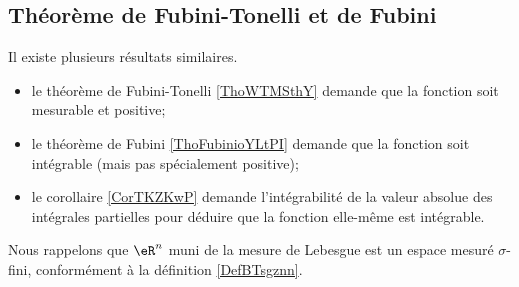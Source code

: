 \subsection{Théorème de Fubini-Tonelli et de Fubini}

Il existe plusieurs résultats similaires. 
\begin{itemize}
    \item
        le théorème de Fubini-Tonelli \ref{ThoWTMSthY} demande que la fonction soit mesurable et positive;
    \item
        le théorème de Fubini \ref{ThoFubinioYLtPI} demande que la fonction soit intégrable (mais pas spécialement positive);
    \item
        le corollaire \ref{CorTKZKwP} demande l'intégrabilité de la valeur absolue des intégrales partielles pour déduire que la fonction elle-même est intégrable.
\end{itemize}


Nous rappelons que \( \eR^n\) muni de la mesure de Lebesgue est un espace mesuré \( \sigma\)-fini, conformément à la définition \ref{DefBTsgznn}.


